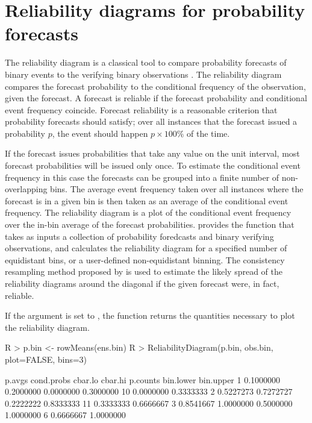 \documentclass[article]{jss}
\begin{document}
\section{Reliability diagrams for probability forecasts}

The reliability diagram is a classical tool to compare probability forecasts of binary events to the verifying binary observations \citep{jolliffe2012forecast}.
The reliability diagram compares the forecast probability to the conditional frequency of the observation, given the forecast.
A forecast is reliable if the forecast probability and conditional event frequency coincide.
Forecast reliability is a reasonable criterion that probability forecasts should satisfy; over all instances that the forecast issued a probability $p$, the event should happen $p\times 100\%$ of the time.

If the forecast issues probabilities that take any value on the unit interval, most forecast probabilities will be issued only once.
To estimate the conditional event frequency in this case the forecasts can be grouped into a finite number of non-overlapping bins.
The average event frequency taken over all instances where the forecast is in a given bin is then taken as an average of the conditional event frequency.
The reliability diagram is a plot of the conditional event frequency over the in-bin average of the forecast probabilities.
 provides the function  that takes as inputs a collection of probability foredcasts and binary verifying observations, and calculates the reliability diagram for a specified number of equidistant bins, or a user-defined non-equidistant binning.
The consistency resampling method proposed by \citet{broecker2007increasing} is used to estimate the likely spread of the reliability diagrams around the diagonal if the given forecast were, in fact, reliable.


If the  argument is set to , the  function returns the quantities necessary to plot the reliability diagram.

\begin{Schunk}
\begin{Sinput}
R > p.bin <- rowMeans(ens.bin)
R > ReliabilityDiagram(p.bin, obs.bin, plot=FALSE, bins=3)
\end{Sinput}
\begin{Soutput}
     p.avgs cond.probs   cbar.lo   cbar.hi p.counts bin.lower bin.upper
1 0.1000000  0.2000000 0.0000000 0.3000000       10 0.0000000 0.3333333
2 0.5227273  0.7272727 0.2222222 0.8333333       11 0.3333333 0.6666667
3 0.8541667  1.0000000 0.5000000 1.0000000        6 0.6666667 1.0000000
\end{Soutput}
\end{Schunk}
\end{document}
